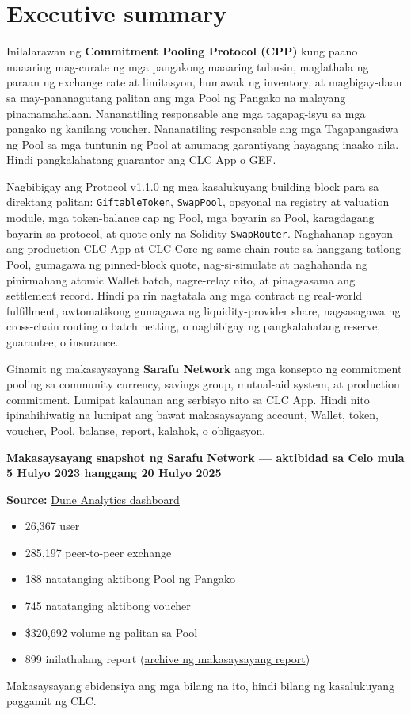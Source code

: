 \documentclass[11pt]{article}
\begin{document}
\section*{Executive summary}

Inilalarawan ng \textbf{Commitment Pooling Protocol (CPP)} kung paano maaaring mag-curate ng mga pangakong maaaring tubusin, maglathala ng paraan ng exchange rate at limitasyon, humawak ng inventory, at magbigay-daan sa may-pananagutang palitan ang mga Pool ng Pangako na malayang pinamamahalaan. Nananatiling responsable ang mga tagapag-isyu sa mga pangako ng kanilang voucher. Nananatiling responsable ang mga Tagapangasiwa ng Pool sa mga tuntunin ng Pool at anumang garantiyang hayagang inaako nila. Hindi pangkalahatang guarantor ang CLC App o GEF.

Nagbibigay ang Protocol v1.1.0 ng mga kasalukuyang building block para sa direktang palitan: \texttt{GiftableToken}, \texttt{SwapPool}, opsyonal na registry at valuation module, mga token-balance cap ng Pool, mga bayarin sa Pool, karagdagang bayarin sa protocol, at quote-only na Solidity \texttt{SwapRouter}. Naghahanap ngayon ang production CLC App at CLC Core ng same-chain route sa hanggang tatlong Pool, gumagawa ng pinned-block quote, nag-si-simulate at naghahanda ng pinirmahang atomic Wallet batch, nagre-relay nito, at pinagsasama ang settlement record. Hindi pa rin nagtatala ang mga contract ng real-world fulfillment, awtomatikong gumagawa ng liquidity-provider share, nagsasagawa ng cross-chain routing o batch netting, o nagbibigay ng pangkalahatang reserve, guarantee, o insurance.

Ginamit ng makasaysayang \textbf{Sarafu Network} ang mga konsepto ng commitment pooling sa community currency, savings group, mutual-aid system, at production commitment. Lumipat kalaunan ang serbisyo nito sa CLC App. Hindi nito ipinahihiwatig na lumipat ang bawat makasaysayang account, Wallet, token, voucher, Pool, balanse, report, kalahok, o obligasyon.

\textbf{Makasaysayang snapshot ng Sarafu Network --- aktibidad sa Celo mula 5 Hulyo 2023 hanggang 20 Hulyo 2025}

\textbf{Source:} \href{https://dune.com/grassrootseconomics/sarafu-network}{Dune Analytics dashboard}

\begin{itemize}[leftmargin=*]
\item 26,367 user
\item 285,197 peer-to-peer exchange
\item 188 natatanging aktibong Pool ng Pangako
\item 745 natatanging aktibong voucher
\item \$320,692 volume ng palitan sa Pool
\item 899 inilathalang report (\href{https://sarafu.network/reports}{archive ng makasaysayang report})
\end{itemize}
Makasaysayang ebidensiya ang mga bilang na ito, hindi bilang ng kasalukuyang paggamit ng CLC.
\end{document}
